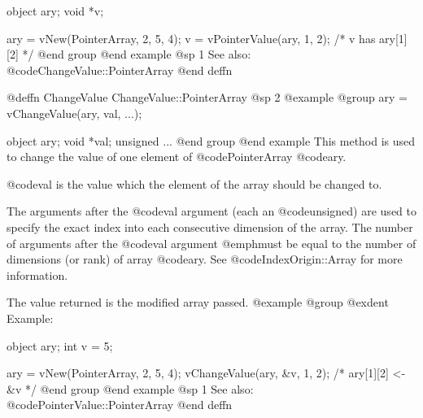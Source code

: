 object  ary;
void    *v;

ary = vNew(PointerArray, 2, 5, 4);
v = vPointerValue(ary, 1, 2);
/*  v has ary[1][2]  */
@end group
@end example
@sp 1
See also:  @code{ChangeValue::PointerArray}
@end deffn








@deffn {ChangeValue} ChangeValue::PointerArray
@sp 2
@example
@group
ary = vChangeValue(ary, val, ...);

object    ary;
void     *val;
unsigned  ...
@end group
@end example
This method is used to change the value of one element of
@code{PointerArray} @code{ary}.

@code{val} is the value which the element of the array should be changed
to.

The arguments after the @code{val} argument (each an @code{unsigned})
are used to specify the exact index into each consecutive dimension of
the array.  The number of arguments after the @code{val} argument
@emph{must} be equal to the number of dimensions (or rank) of array
@code{ary}.  See @code{IndexOrigin::Array} for more information.

The value returned is the modified array passed.
@example
@group
@exdent Example:

object  ary;
int     v = 5;

ary = vNew(PointerArray, 2, 5, 4);
vChangeValue(ary, &v, 1, 2);
/*  ary[1][2] <- &v  */
@end group
@end example
@sp 1
See also:  @code{PointerValue::PointerArray}
@end deffn




